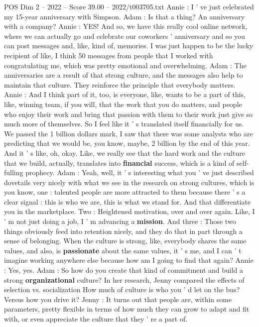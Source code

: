 \begin{textsample}{POS Dim 2 – 2022 – Score 39.00 – 2022/t003705.txt}
Annie : I ' ve just celebrated my 15-year anniversary with Simpson.
Adam : Is that a thing?
An anniversary with a company?
Annie : YES!
And so, we have this really cool online network, where we can actually go and celebrate our coworkers ' anniversary and so you can post messages and, like, kind of, memories.
I was just happen to be the lucky recipient of like, I think 50 messages from people that I worked with congratulating me, which was pretty emotional and overwhelming.
Adam : The anniversaries are a result of that strong culture, and the messages also help to maintain that culture.
They reinforce the principle that everybody matters.
Annie : And I think part of it, too, is everyone, like, wants to be a part of this, like, winning team, if you will, that the work that you do matters, and people who enjoy their work and bring that passion with them to their work just give so much more of themselves.
So I feel like it ' s translated itself financially for us.
We passed the 1 billion dollars mark, I saw that there was some analysts who are predicting that we would be, you know, maybe, 2 billion by the end of this year.
And it ' s like, oh, okay.
Like, we really see that the hard work and the culture that we build, actually, translates into \textbf{financial} success, which is a kind of self-fulling prophecy.
Adam : Yeah, well, it ' s interesting what you ' ve just described dovetails very nicely with what we see in the research on strong cultures, which is you know, one : talented people are more attracted to them because there ' s a clear signal : this is who we are, this is what we stand for.
And that differentiate you in the marketplace.
Two : Heightened motivation, over and over again.
Like, I ' m not just doing a job, I ' m advancing a \textbf{mission}.
And three : Those two things obviously feed into retention nicely, and they do that in part through a sense of belonging.
When the culture is strong, like, everybody shares the same values, and also, is \textbf{passionate} about the same values, it ' s me, and I can ' t imagine working anywhere else because how am I going to find that again?
Annie : Yes, yes.
Adam : So how do you create that kind of commitment and build a strong \textbf{organizational} culture?
In her research, Jenny compared the effects of selection vs. socialization How much of culture is who you ' d let on the bus?
Versus how you drive it?
Jenny : It turns out that people are, within some parameters, pretty flexible in terms of how much they can grow to adapt and fit with, or even appreciate the culture that they ' re a part of.

\end{textsample}
